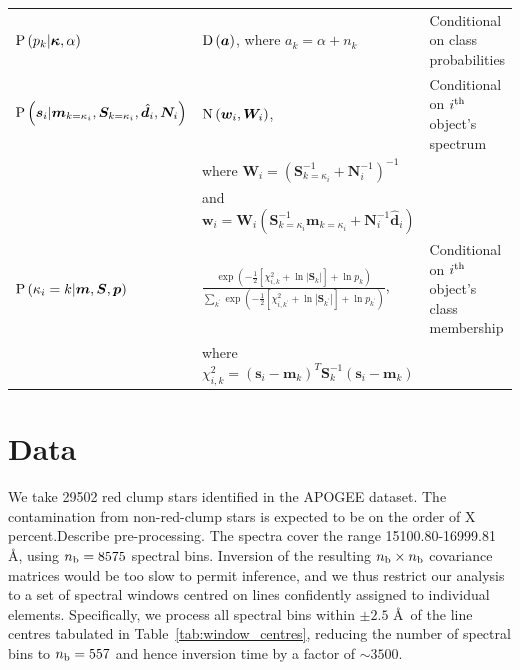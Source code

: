 \documentclass[a4paper,fleqn,usenatbib]{mnras}
\newcommand{\nb}{n_{\rm b}}
\newcommand{\prob}{{\rm P}}
\newcommand{\normal}{{\rm{N}}}
\newcommand{\dirichlet}{{\rm D}}
\newcommand{\alphas}{{\bm a}}
\newcommand{\specmean}{{\bm m}}
\newcommand{\speccov}{{\bm S}}
\newcommand{\classprob}{{p}}
\newcommand{\classprobs}{{\bm p}}
\newcommand{\objspec}{{\bm s}}
\newcommand{\objclass}{{\kappa}}
\newcommand{\objclasses}{{\bm \kappa}}
\newcommand{\objdata}{\hat{\bm d}}
\newcommand{\objnoise}{{\bm N}}
\newcommand{\wfmean}{{\bm w}}
\newcommand{\wfcov}{{\bm W}}
\begin{document}
\begin{table}
\begin{tabular}{lll}
        $\prob\left(\classprob_k | \objclasses, \alpha\right)$ & $\dirichlet\left(\alphas\right)$, where $a_k = \alpha + n_k$ & Conditional on class probabilities \\
        $\prob \left( \objspec_i | \specmean_{k=\objclass_i}, \speccov_{k=\objclass_i}, \objdata_i, \objnoise_i \right)$ & $\normal \left( \wfmean_i, \wfcov_i \right)$, & Conditional on $i^{\rm th}$ object's spectrum \\
         & where $\wfcov_i = \left( \speccov_{k=\objclass_i}^{-1} + \objnoise_i^{-1} \right)^{-1}$ &  \\
         & and $\wfmean_i = \wfcov_i \left( \speccov_{k=\objclass_i}^{-1} \specmean_{k=\objclass_i} + \objnoise_i^{-1} \objdata_i \right)$ &  \\
        $\prob \left( \objclass_i = k | \specmean, \speccov, \classprobs \right)$ & $ \frac{ \exp \left( -\frac{1}{2} \left[ \chi^2_{i,k} + \ln \left| \speccov_k \right| \right] + \ln \classprob_k \right) }{ \sum_{k^\prime} \exp \left( -\frac{1}{2} \left[ \chi^2_{i,k^\prime} + \ln \left| \speccov_{k^\prime} \right| \right] + \ln \classprob_{k^\prime} \right) }$, & Conditional on $i^{\rm th}$ object's class membership \\
         & where $\chi^2_{i,k} = \left( \objspec_i - \specmean_k \right)^T \speccov_k^{-1} \left( \objspec_i - \specmean_k \right) $ &  \\
        \hline
    \end{tabular}
\end{table}


\section{Data}

We take 29502 red clump stars identified in the APOGEE dataset. The contamination from non-red-clump stars is expected to be on the order of X percent.Describe pre-processing. The spectra cover the range 15100.80-16999.81 \AA, using $\nb = 8575$ spectral bins. Inversion of the resulting $\nb \times \nb$ covariance matrices would be too slow to permit inference, and we thus restrict our analysis to a set of spectral windows centred on lines confidently assigned to individual elements. Specifically, we process all spectral bins within $\pm2.5$ \AA\ of the line centres tabulated in Table~\ref{tab:window_centres}, reducing the number of spectral bins to $\nb = 557$ and hence inversion time by a factor of $\sim3500$.
\end{document}
